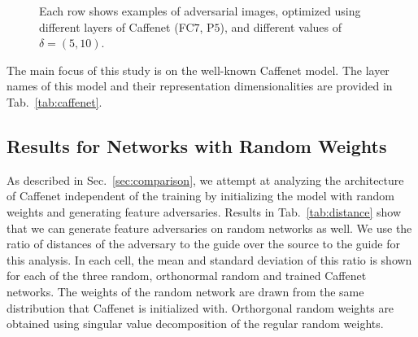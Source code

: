 \documentclass{article} %
\begin{document}
\begin{figure*}[h!]
\begin{tabular}
\hline
\end{tabular}
\caption{Each row shows examples of adversarial images, optimized
using different layers of Caffenet (FC$7$, P$5$), and different 
values of $\delta=(5, 10)$.  }
\label{fig:adv_caffenet_page}
\vspace*{-0.1cm}
\end{figure*}%
The main focus of this study is on the well-known Caffenet model. The layer 
names of this model and their representation dimensionalities are provided in 
Tab.~\ref{tab:caffenet}.

\begin{table}[h!]
\caption{Caffenet layer dimensions.}
\label{tab:caffenet}
\end{table}\subsection{Results for Networks with Random Weights}
As described in Sec.~\ref{sec:comparison}, we attempt at analyzing the 
architecture of Caffenet independent of the training by initializing the model 
with random weights and generating feature adversaries. Results in 
Tab.~\ref{tab:distance} show that we can generate feature adversaries on random 
networks as well.  We use the ratio of distances of the adversary to the guide 
over the source to the guide for this analysis. In each cell, the mean and 
standard deviation of this ratio is shown for each of the three random, 
orthonormal random and trained Caffenet networks.  The weights of the random 
network are drawn from the same distribution that Caffenet is initialized with.  
Orthorgonal random weights are obtained using singular value decomposition of the regular random weights.
\end{document}
